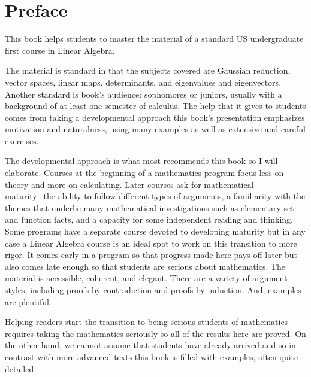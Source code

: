 {\setlength{\parskip}{.7ex}  %
\chapter*{Preface}
This book helps students to master the material of a standard 
US undergraduate first course in Linear Algebra.

The material is standard in that the subjects covered are
Gaussian reduction, 
vector spaces, linear maps,
determinants, and eigenvalues and eigenvectors.
Another standard is book's audience:
sophomores or juniors, usually with a background 
of at least one semester of calculus. 
The help that it gives to students comes from taking a developmental 
approach\Dash 
this book's presentation emphasizes motivation and naturalness, 
using many examples as well as extensive and careful exercises.

The developmental approach is what most recommends this book
so I will elaborate.
Courses at the beginning of a mathematics program
focus less on theory and more on calculating.
Later courses
ask for mathematical maturity:~the ability to follow different 
types of arguments, 
a familiarity with
the themes that underlie many mathematical investigations such as
elementary set and function facts,
and a capacity for some independent reading and thinking.
Some programs have a separate course devoted to developing maturity but
in any case a Linear Algebra course 
is an ideal spot to work on this transition to more rigor.
It comes early in a program so that progress made here pays off later
but also comes late enough so that
students are serious about mathematics.
The material is accessible, coherent, and elegant.
There are a variety of argument styles, including 
proofs by
contradiction and proofs by induction.
And, examples are plentiful.

Helping readers start the transition to being serious students of 
mathematics
requires taking the mathematics seriously so
all of the results here are proved.
On the other hand, we cannot
assume that students have already arrived
and so 
in contrast with more advanced texts 
this book is filled with examples,
often quite detailed.

}
